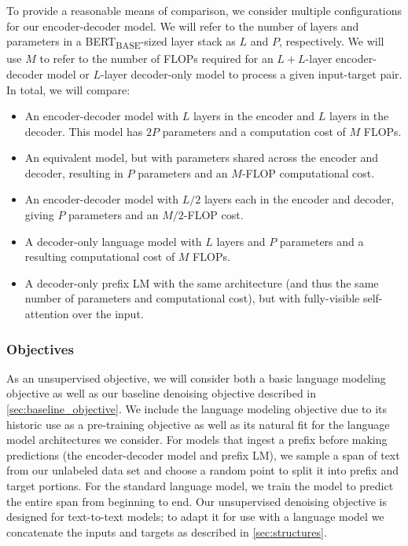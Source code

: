 \documentclass[twoside,11pt]{article}
\begin{document}
To provide a reasonable means of comparison, we consider multiple configurations for our encoder-decoder model.
We will refer to the number of layers and parameters in a BERT\textsubscript{BASE}-sized layer stack as $L$ and $P$, respectively.
We will use $M$ to refer to the number of FLOPs required for an $L + L$-layer encoder-decoder model or $L$-layer decoder-only model to process a given input-target pair.
In total, we will compare:
\begin{itemize}
    \item An encoder-decoder model with $L$ layers in the encoder and $L$ layers in the decoder. This model has $2P$ parameters and a computation cost of $M$ FLOPs.
    \item An equivalent model, but with parameters shared across the encoder and decoder, resulting in $P$ parameters and an $M$-FLOP computational cost.
    \item An encoder-decoder model with $L/2$ layers each in the encoder and decoder, giving $P$ parameters and an $M/2$-FLOP cost.
    \item A decoder-only language model with $L$ layers and $P$ parameters and a resulting computational cost of $M$ FLOPs.
    \item A decoder-only prefix LM with the same architecture (and thus the same number of parameters and computational cost), but with fully-visible self-attention over the input.
\end{itemize}

\subsubsection{Objectives}
\label{sec:architecture_objectives}

As an unsupervised objective, we will consider both a basic language modeling objective as well as our baseline denoising objective described in \cref{sec:baseline_objective}.
We include the language modeling objective due to its historic use as a pre-training objective \citep{dai2015semi,ramachandran2016unsupervised,howard2018universal,radford2018improving,peters2018deep} as well as its natural fit for the language model architectures we consider.
For models that ingest a prefix before making predictions (the encoder-decoder model and prefix LM), we sample a span of text from our unlabeled data set and choose a random point to split it into prefix and target portions.
For the standard language model, we train the model to predict the entire span from beginning to end.
Our unsupervised denoising objective is designed for text-to-text models; to adapt it for use with a language model we concatenate the inputs and targets as described in \cref{sec:structures}.
\end{document}
